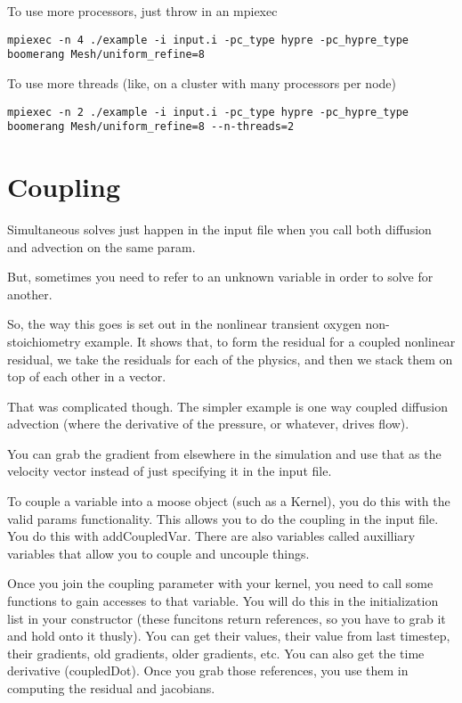 To use more processors, just throw in an mpiexec 

\begin{verbatim}
mpiexec -n 4 ./example -i input.i -pc_type hypre -pc_hypre_type boomerang Mesh/uniform_refine=8
\end{verbatim}


To use more threads (like, on a cluster with many processors per node)

\begin{verbatim}
mpiexec -n 2 ./example -i input.i -pc_type hypre -pc_hypre_type boomerang Mesh/uniform_refine=8 --n-threads=2
\end{verbatim}



\section{Coupling}

Simultaneous solves just happen in the input file when you call both diffusion 
and advection on the same param. 

But, sometimes you need to refer to an unknown variable in order to solve for 
another. 

So, the way this goes is set out in the nonlinear transient oxygen 
non-stoichiometry example. It shows that, to form the residual for a coupled 
nonlinear residual, we take the residuals for each of the physics, and then we 
stack them on top of each other in a vector.  

That was complicated though. The simpler example is one way coupled diffusion 
advection (where the derivative of the pressure, or whatever, drives flow).

You can grab the gradient from elsewhere in the simulation and use that as the 
velocity vector instead of just specifying it in the input file. 


To couple a variable into a moose object (such as a Kernel), you do this with 
the valid params functionality. This allows you to do the coupling in the input 
file. You do this with addCoupledVar. There are also variables called auxilliary 
variables that allow you to couple and uncouple things. 

Once you join the coupling parameter with your kernel, you need to call some 
functions to gain accesses to that variable. You will do this in the 
initialization list in your constructor (these funcitons return references, so 
you have to grab it and hold onto it thusly). You can get their values, their 
value from last timestep, their gradients, old gradients, older gradients, etc. 
You can also get the time derivative (coupledDot). Once you grab those 
references, you use them in computing the residual and jacobians. 





